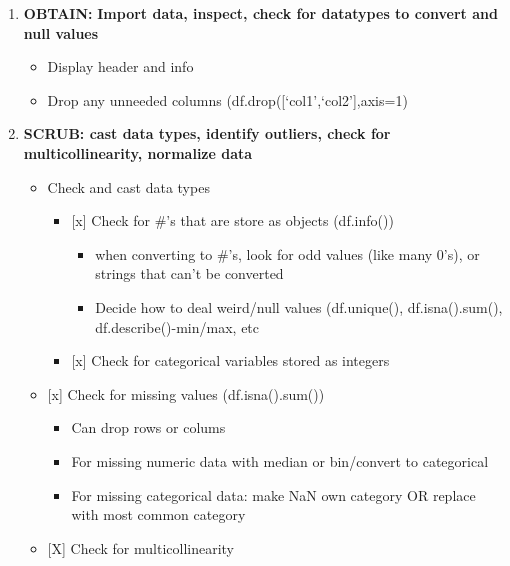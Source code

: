 \documentclass[11pt]{article}
\providecommand{\tightlist}{%
      \setlength{\itemsep}{0pt}\setlength{\parskip}{0pt}}
\begin{document}
\begin{enumerate}
\def\labelenumi{\arabic{enumi}.}
\tightlist
\item
  \textbf{OBTAIN:} \textbf{Import data, inspect, check for datatypes to
  convert and null values}

  \begin{itemize}
  \tightlist
  \item
    Display header and info
  \item
    Drop any unneeded columns (df.drop({[}`col1',`col2'{]},axis=1)
  \end{itemize}
\item
  \textbf{SCRUB: cast data types, identify outliers, check for
  multicollinearity, normalize data}

  \begin{itemize}
  \tightlist
  \item
    Check and cast data types

    \begin{itemize}
    \tightlist
    \item
      {[}x{]} Check for \#'s that are store as objects (df.info())

      \begin{itemize}
      \tightlist
      \item
        when converting to \#'s, look for odd values (like many 0's), or
        strings that can't be converted
      \item
        Decide how to deal weird/null values (df.unique(),
        df.isna().sum(), df.describe()-min/max, etc
      \end{itemize}
    \item
      {[}x{]} Check for categorical variables stored as integers
    \end{itemize}
  \item
    {[}x{]} Check for missing values (df.isna().sum())

    \begin{itemize}
    \tightlist
    \item
      Can drop rows or colums
    \item
      For missing numeric data with median or bin/convert to categorical
    \item
      For missing categorical data: make NaN own category OR replace
      with most common category
    \end{itemize}
  \item
    {[}X{]} Check for multicollinearity


\end{itemize}
\end{enumerate}
\end{document}

